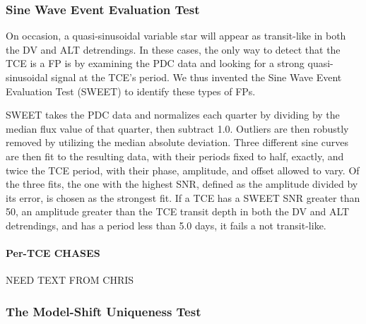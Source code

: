 



\subsubsection{Sine Wave Event Evaluation Test}
\label{s:sweetntl}

On occasion, a quasi-sinusoidal variable star will appear as transit-like in both the DV and ALT detrendings. In these cases, the only way to detect that the TCE is a FP is by examining the PDC data and looking for a strong quasi-sinusoidal signal at the TCE's period. We thus invented the Sine Wave Event Evaluation Test (SWEET) to identify these types of FPs.

SWEET takes the PDC data and normalizes each quarter by dividing by the median flux value of that quarter, then subtract 1.0. Outliers are then robustly removed by utilizing the median absolute deviation. Three different sine curves are then fit to the resulting data, with their periods fixed to half, exactly, and twice the TCE period, with their phase, amplitude, and offset allowed to vary. Of the three fits, the one with the highest SNR, defined as the amplitude divided by its error, is chosen as the strongest fit. If a TCE has a SWEET SNR greater than 50, an amplitude greater than the TCE transit depth in both the DV and ALT detrendings, and has a period less than 5.0 days, it fails a not transit-like.




\paragraph{Per-TCE CHASES}
\label{s:tcechases}
NEED TEXT FROM CHRIS




\subsubsection{The Model-Shift Uniqueness Test}
\label{s:ms}

